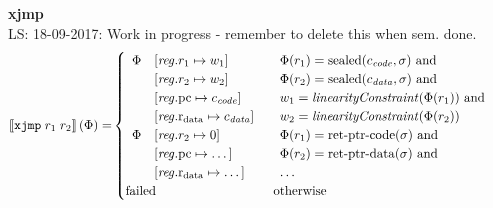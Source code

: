 \documentclass[a4paper]{article}
\newcommand\lau[1]{{\color{purple} \sf \footnotesize {LS: #1}}\\}
\newcommand{\sem}[1]{\left\llbracket #1 \right\rrbracket}
\newcommand{\tand}{\text{ and }}
\newcommand{\totherwise}{\text{otherwise }}
\newcommand{\targetcolor}[1]{\color{black}}
\newcommand{\trg}[1]{{\targetcolor{} #1}}
\newcommand{\zinstr}[1]{\texttt{#1}}
\newcommand{\twoinstr}[3]{
  \ifthenelse{\equal{#2#3}{}}
  {\zinstr{#1}}
  {\zinstr{#1} \; #2 \; #3}
}
\newcommand{\txjmp}[2]{\twoinstr{\trg{xjmp}}{#1}{#2}}
\newcommand{\update}[2]{[#1 \mapsto #2]}
\newcommand{\updReg}[2]{\update{\reg.#1}{#2}}
\newcommand{\shareddom}[1]{\mathrm{#1}}
\newcommand{\retptrd}{\mathrm{ret\text{-}ptr\text{-}data}}
\newcommand{\retptrc}{\mathrm{ret\text{-}ptr\text{-}code}}
\newcommand{\sealed}[1]{\shareddom{sealed}(#1)}
\newcommand{\failed}{\mathrm{failed}}
\newcommand{\var}[1]{\mathit{#1}}
\newcommand{\reg}{\var{reg}}
\newcommand{\data}{\var{data}}
\newcommand{\code}{\var{code}}
\newcommand{\pcreg}{\mathrm{pc}}
\newcommand{\rdata}{\mathrm{r}_\mathrm{data}}
\newcommand{\plainfun}[2]{
  \ifthenelse{\equal{#2}{}}
  {\mathit{#1}}
  {\mathit{#1}(#2)}
}
\newcommand{\linCons}[1]{\plainfun{linearityConstraint}{#1}}
\begin{document}
\noindent\textbf{xjmp}\\
\lau{18-09-2017: Work in progress - remember to delete this when sem. done.}
\begin{align*}
  \sem{\txjmp{r_1}{r_2}}(\Phi) = &
                                   \begin{cases}
                                       \begin{array}[t]{rl}
                                         \Phi & \updReg{r_1}{w_1}\\
                                              & \updReg{r_2}{w_2}\\
                                              & \updReg{\pcreg}{c_\code}\\
                                              & \updReg{\rdata}{c_\data}
                                       \end{array}&
                                     \begin{array}[t]{l}
                                       \Phi(r_1) = \sealed{c_\code,\sigma} \tand \\
                                       \Phi(r_2) = \sealed{c_\data,\sigma} \tand \\
                                       w_1 = \linCons{\Phi(r_1)} \tand \\
                                       w_2 = \linCons{\Phi(r_2)}
                                     \end{array}
                                     \\
                                     \begin{array}[t]{rl}
                                       \Phi & \updReg{r_2}{0} \\
                                            & \updReg{\pcreg}{\dots}\\
                                            & \updReg{\rdata}{\dots}
                                     \end{array}&
                                     \begin{array}[t]{l}
                                       \Phi(r_1) = \retptrc(\sigma) \tand \\
                                       \Phi(r_2) = \retptrd(\sigma) \tand \\
                                       \dots
                                     \end{array}
                                     \\
                                     \failed & \totherwise
                                   \end{cases}
\end{align*}
\end{document}
